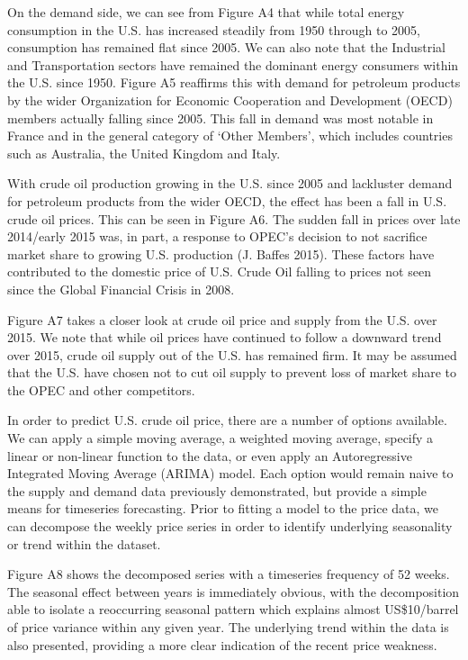 \documentclass[]{article}
\begin{document}
On the demand side, we can see from Figure A4 that while total energy
consumption in the U.S. has increased steadily from 1950 through to
2005, consumption has remained flat since 2005. We can also note that
the Industrial and Transportation sectors have remained the dominant
energy consumers within the U.S. since 1950. Figure A5 reaffirms this
with demand for petroleum products by the wider Organization for
Economic Cooperation and Development (OECD) members actually falling
since 2005. This fall in demand was most notable in France and in the
general category of `Other Members', which includes countries such as
Australia, the United Kingdom and Italy.

With crude oil production growing in the U.S. since 2005 and lackluster
demand for petroleum products from the wider OECD, the effect has been a
fall in U.S. crude oil prices. This can be seen in Figure A6. The sudden
fall in prices over late 2014/early 2015 was, in part, a response to
OPEC's decision to not sacrifice market share to growing U.S. production
(J. Baffes 2015). These factors have contributed to the domestic price
of U.S. Crude Oil falling to prices not seen since the Global Financial
Crisis in 2008.

Figure A7 takes a closer look at crude oil price and supply from the
U.S. over 2015. We note that while oil prices have continued to follow a
downward trend over 2015, crude oil supply out of the U.S. has remained
firm. It may be assumed that the U.S. have chosen not to cut oil supply
to prevent loss of market share to the OPEC and other competitors.

In order to predict U.S. crude oil price, there are a number of options
available. We can apply a simple moving average, a weighted moving
average, specify a linear or non-linear function to the data, or even
apply an Autoregressive Integrated Moving Average (ARIMA) model. Each
option would remain naive to the supply and demand data previously
demonstrated, but provide a simple means for timeseries forecasting.
Prior to fitting a model to the price data, we can decompose the weekly
price series in order to identify underlying seasonality or trend within
the dataset.

Figure A8 shows the decomposed series with a timeseries frequency of 52
weeks. The seasonal effect between years is immediately obvious, with
the decomposition able to isolate a reoccurring seasonal pattern which
explains almost US\$10/barrel of price variance within any given year.
The underlying trend within the data is also presented, providing a more
clear indication of the recent price weakness.
\end{document}
